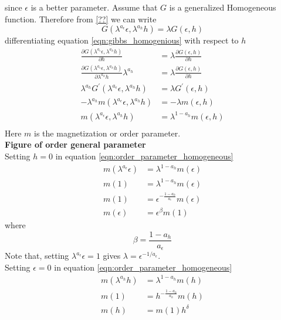 	since $\epsilon$ is a better parameter. Assume that $G$ is a generalized Homogeneous function. Therefore from \ref{??} we can write
	\begin{equation}
		G(\lambda^{a_\epsilon} \epsilon, \lambda^{a_h} h) = \lambda G(\epsilon, h)
		\label{eqn:gibbs_homogenious}
	\end{equation}
	differentiating equation \ref{eqn:gibbs_homogenious} with respect to $h$
	\begin{align}
		\frac{\partial G(\lambda^{a_\epsilon} \epsilon, \lambda^{a_h} h)}{\partial h} &= \lambda \frac{\partial G(\epsilon, h)}{\partial h} \nonumber \\
		\frac{\partial G(\lambda^{a_\epsilon} \epsilon, \lambda^{a_h} h)}{\partial \lambda^{a_h} h} \lambda^{a_h} &= \lambda \frac{\partial G(\epsilon, h)}{\partial h} \nonumber \\
		\lambda^{a_h} G^\prime(\lambda^{a_\epsilon} \epsilon, \lambda^{a_h} h) &= \lambda G^\prime (\epsilon, h) \nonumber \\
		-\lambda^{a_h} m(\lambda^{a_\epsilon} \epsilon, \lambda^{a_h} h) &= -\lambda m(\epsilon, h) \nonumber \\
		m(\lambda^{a_\epsilon} \epsilon, \lambda^{a_h} h) &= \lambda^{1-a_h} m(\epsilon, h) \\
		\label{eqn:order_parameter_homogeneous}
	\end{align}
	Here $m$ is the magnetization or order parameter.\\
	\textbf{Figure of order general parameter}\\
	Setting $h=0$ in equation \ref{eqn:order_parameter_homogeneous}
	\begin{align}
		m(\lambda^{a_\epsilon} \epsilon)	 &= \lambda^{1-a_h} m(\epsilon) \nonumber \\
		m(1)	 &= \lambda^{1-a_h} m(\epsilon) \nonumber \\
		m(1)	 &= \epsilon^{-\frac{1-a_h}{a_\epsilon}} m(\epsilon) \nonumber \\
		m(\epsilon) &= \epsilon^\beta m(1) \label{eqn:order_parameter_and_beta}
	\end{align}
	where
	\begin{equation}
		\beta = \frac{1-a_h}{a_\epsilon}
		\label{eqn:beta}
	\end{equation}
	Note that, setting $\lambda^{a_\epsilon} \epsilon = 1$ gives $\lambda = \epsilon^{-1/a_\epsilon}$.\\
	Setting $\epsilon=0$ in equation \ref{eqn:order_parameter_homogeneous}
	\begin{align}
		m(\lambda^{a_h} h) &= \lambda^{1-a_h} m(h) \nonumber \\
		m(1) &= h^{-\frac{1-a_h}{a_h}} m(h) \nonumber \\
		m(h) &= m(1) h^\delta \label{eqn:order_parameter_and_delta}
	\end{align}
